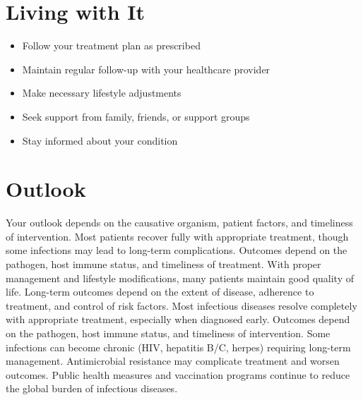 \section{Living with It}
\begin{itemize}[noitemsep]
  \item Follow your treatment plan as prescribed
  \item Maintain regular follow-up with your healthcare provider
  \item Make necessary lifestyle adjustments
  \item Seek support from family, friends, or support groups
  \item Stay informed about your condition
\end{itemize}
\section{Outlook}
Your outlook depends on the causative organism, patient factors, and timeliness of intervention. Most patients recover fully with appropriate treatment, though some infections may lead to long-term complications. Outcomes depend on the pathogen, host immune status, and timeliness of treatment. With proper management and lifestyle modifications, many patients maintain good quality of life. Long-term outcomes depend on the extent of disease, adherence to treatment, and control of risk factors. Most infectious diseases resolve completely with appropriate treatment, especially when diagnosed early. Outcomes depend on the pathogen, host immune status, and timeliness of intervention. Some infections can become chronic (HIV, hepatitis B/C, herpes) requiring long-term management. Antimicrobial resistance may complicate treatment and worsen outcomes. Public health measures and vaccination programs continue to reduce the global burden of infectious diseases.
